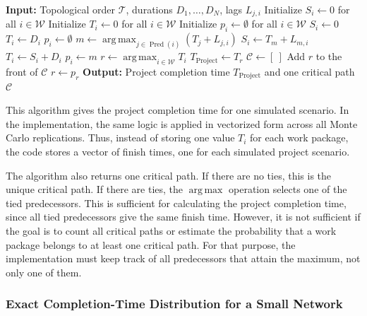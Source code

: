 \documentclass[11pt,a4paper]{article}
\newcommand{\cW}{\mathcal{W}}
\newcommand{\1}{\mathbf{1}}
\newcommand{\Pred}{\operatorname{Pred}}
\newcommand{\argmax}{\operatorname*{arg\,max}}
\theoremstyle{definition}
\theoremstyle{plain}
\theoremstyle{remark}
\numberwithin{equation}{section}
\begin{document}
\begin{algorithm}[H]
\caption{Project completion time and one critical path in a project network}
\label{alg:longest-path-critical}
\begin{algorithmic}[1]
\State \textbf{Input:} Topological order $\mathcal{T}$, durations $D_1,\ldots,D_N$, lags $L_{j,i}$
\State Initialize $S_i\leftarrow 0$ for all $i\in\cW$ 
\State Initialize $T_i\leftarrow 0$ for all $i\in\cW$ 
\State Initialize $p_i\leftarrow \emptyset$ for all $i\in\cW$ 
    \If{$\Pred(i)=\emptyset$}
        \State $S_i\leftarrow 0$
        \State $T_i\leftarrow D_i$
        \State $p_i\leftarrow \emptyset$
    \Else
        \State $m\leftarrow \argmax_{j\in\Pred(i)}(T_j+L_{j,i})$
        \State $S_i\leftarrow T_m+L_{m,i}$
        \State $T_i\leftarrow S_i+D_i$
        \State $p_i\leftarrow m$
    \EndIf
\EndFor
\State $r\leftarrow \argmax_{i\in\cW}T_i$
\State $T_{\text{Project}}\leftarrow T_r$
\State $\mathcal{C}\leftarrow [\ ]$
    \State Add $r$ to the front of $\mathcal{C}$
    \State $r\leftarrow p_r$
\EndWhile
\State \textbf{Output:} Project completion time $T_{\text{Project}}$ and one critical path $\mathcal{C}$
\end{algorithmic}
\end{algorithm}

This algorithm gives the project completion time for one simulated scenario. In the implementation, the same logic is applied in vectorized form across all Monte Carlo replications. Thus, instead of storing one value $T_i$ for each work package, the code stores a vector of finish times, one for each simulated project scenario.

The algorithm also returns one critical path. If there are no ties, this is the unique critical path. If there are ties, the $\argmax$ operation selects one of the tied predecessors. This is sufficient for calculating the project completion time, since all tied predecessors give the same finish time. However, it is not sufficient if the goal is to count all critical paths or estimate the probability that a work package belongs to at least one critical path. For that purpose, the implementation must keep track of all predecessors that attain the maximum, not only one of them.

\subsubsection{Exact Completion-Time Distribution for a Small Network}
\end{document}
